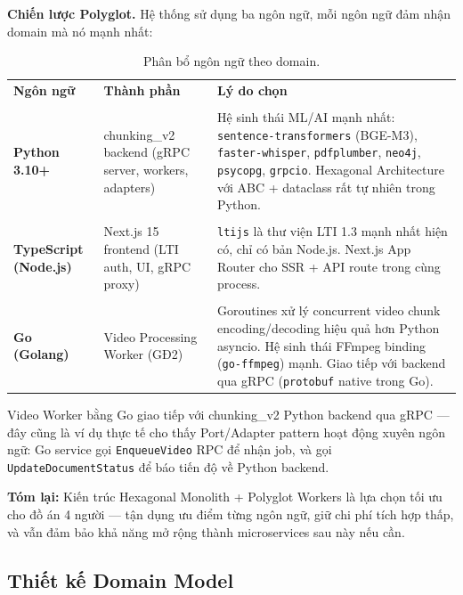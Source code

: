 \textbf{Chiến lược Polyglot.} Hệ thống sử dụng ba ngôn ngữ, mỗi ngôn
ngữ đảm nhận domain mà nó mạnh nhất:

\begin{table}[H]
    \centering
    \caption{Phân bổ ngôn ngữ theo domain.}
    \label{tab:polyglot}
    \begin{tabular}{p{2.5cm}p{5cm}p{7cm}}
        \toprule
        \textbf{Ngôn ngữ} & \textbf{Thành phần} & \textbf{Lý do chọn} \\\\
        \midrule
        \textbf{Python 3.10+}
            & chunking\_v2 backend (gRPC server, workers, adapters)
            & Hệ sinh thái ML/AI mạnh nhất: \texttt{sentence-transformers}
              (BGE-M3), \texttt{faster-whisper}, \texttt{pdfplumber},
              \texttt{neo4j}, \texttt{psycopg}, \texttt{grpcio}.
              Hexagonal Architecture với ABC + dataclass rất tự nhiên
              trong Python. \\\\
        \textbf{TypeScript (Node.js)}
            & Next.js 15 frontend (LTI auth, UI, gRPC proxy)
            & \texttt{ltijs} là thư viện LTI 1.3 mạnh nhất hiện có,
              chỉ có bản Node.js. Next.js App Router cho SSR + API route
              trong cùng process. \\\\
        \textbf{Go (Golang)}
            & Video Processing Worker (GĐ2)
            & Goroutines xử lý concurrent video chunk encoding/decoding
              hiệu quả hơn Python asyncio. Hệ sinh thái FFmpeg binding
              (\texttt{go-ffmpeg}) mạnh. Giao tiếp với backend qua
              gRPC (\texttt{protobuf} native trong Go). \\
        \bottomrule
    \end{tabular}
\end{table}

Video Worker bằng Go giao tiếp với chunking\_v2 Python backend
qua gRPC --- đây cũng là ví dụ thực tế cho thấy Port/Adapter pattern
hoạt động xuyên ngôn ngữ: Go service gọi \texttt{EnqueueVideo} RPC
để nhận job, và gọi \texttt{UpdateDocumentStatus} để báo tiến độ
về Python backend.

\textbf{Tóm lại:} Kiến trúc Hexagonal Monolith + Polyglot Workers
là lựa chọn tối ưu cho đồ án 4 người --- tận dụng ưu điểm từng ngôn
ngữ, giữ chi phí tích hợp thấp, và vẫn đảm bảo khả năng mở rộng
thành microservices sau này nếu cần.

\subsection{Thiết kế Domain Model}

